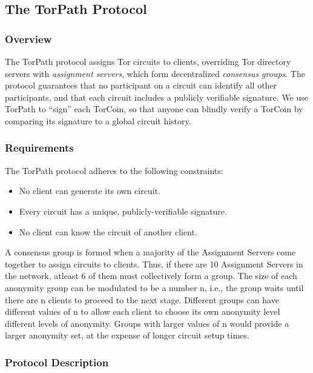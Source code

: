 \subsection{The TorPath Protocol}

\subsubsection{Overview}

The TorPath protocol assigns Tor circuits to clients, overriding Tor directory servers with \textit{assignment servers}, which form decentralized \textit{consensus groups}. The protocol guarantees that no participant on a circuit can identify all other participants, and that each circuit includes a publicly verifiable signature. We use TorPath to ``sign'' each TorCoin, so that anyone can blindly verify a TorCoin by comparing its signature to a global circuit history.

\subsubsection{Requirements}

The TorPath protocol adheres to the following constraints:

\begin{itemize}   
\item No client can generate its own circuit.
\item Every circuit has a unique, publicly-verifiable signature.
\item No client can know the circuit of another client.
\end{itemize}

A consensus group is formed when a majority of the Assignment Servers come
together to assign circuits to clients. Thus, if there are 10 Assignment
Servers in the network, atleast 6 of them must collectively form a group.  The
size of each anonymity group can be modulated to be a number n, i.e., the
group waits until there are n clients to proceed to the next stage. Different
groups can have different values of n to allow each client to choose its own
anonymity level different levels of anonymity. Groups with larger values of n
would provide a larger anonymity set, at the expense of longer circuit setup
times.

\subsubsection{Protocol Description}

